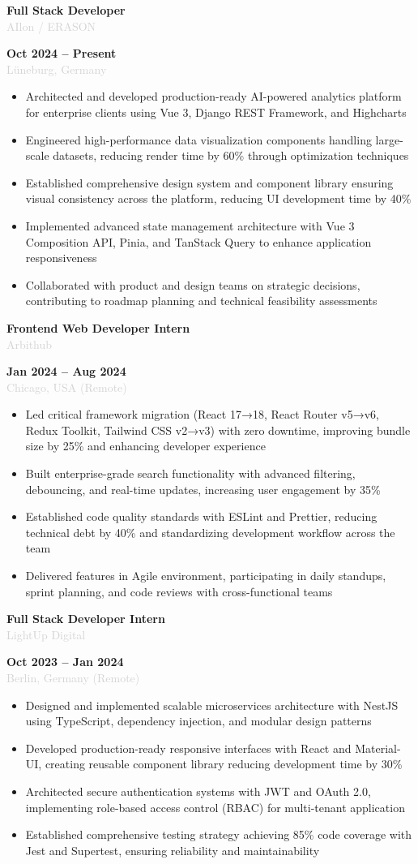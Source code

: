 \documentclass[10pt,a4paper]{article}
\newcommand{\Experience}[4]{%
  \vspace{2pt}
  \noindent
  \begin{minipage}[t]{0.70\textwidth}
    {\normalsize\textbf{\color{darkgray}#3}} \\
    \textcolor{lightgray}{\small #1}
  \end{minipage}%
  \hfill
  \begin{minipage}[t]{0.28\textwidth}
    \raggedleft
    \textcolor{mediumgray}{\small\textbf{#4}} \\
    \textcolor{lightgray}{\small #2}
  \end{minipage}
  \vspace{1pt}
}
\begin{document}
\Experience{AIlon / ERASON}{Lüneburg, Germany}{Full Stack Developer}{Oct 2024 -- Present}
\begin{itemize}
  \item Architected and developed production-ready AI-powered analytics platform for enterprise clients using Vue 3, Django REST Framework, and Highcharts
  \item Engineered high-performance data visualization components handling large-scale datasets, reducing render time by 60\% through optimization techniques
  \item Established comprehensive design system and component library ensuring visual consistency across the platform, reducing UI development time by 40\%
  \item Implemented advanced state management architecture with Vue 3 Composition API, Pinia, and TanStack Query to enhance application responsiveness
  \item Collaborated with product and design teams on strategic decisions, contributing to roadmap planning and technical feasibility assessments
\end{itemize}

\Experience{Arbithub}{Chicago, USA (Remote)}{Frontend Web Developer Intern}{Jan 2024 -- Aug 2024}
\begin{itemize}
  \item Led critical framework migration (React 17→18, React Router v5→v6, Redux Toolkit, Tailwind CSS v2→v3) with zero downtime, improving bundle size by 25\% and enhancing developer experience
  \item Built enterprise-grade search functionality with advanced filtering, debouncing, and real-time updates, increasing user engagement by 35\%
  \item Established code quality standards with ESLint and Prettier, reducing technical debt by 40\% and standardizing development workflow across the team
  \item Delivered features in Agile environment, participating in daily standups, sprint planning, and code reviews with cross-functional teams
\end{itemize}

\Experience{LightUp Digital}{Berlin, Germany (Remote)}{Full Stack Developer Intern}{Oct 2023 -- Jan 2024}
\begin{itemize}
  \item Designed and implemented scalable microservices architecture with NestJS using TypeScript, dependency injection, and modular design patterns
  \item Developed production-ready responsive interfaces with React and Material-UI, creating reusable component library reducing development time by 30\%
  \item Architected secure authentication systems with JWT and OAuth 2.0, implementing role-based access control (RBAC) for multi-tenant application
  \item Established comprehensive testing strategy achieving 85\% code coverage with Jest and Supertest, ensuring reliability and maintainability
\end{itemize}
\end{document}
